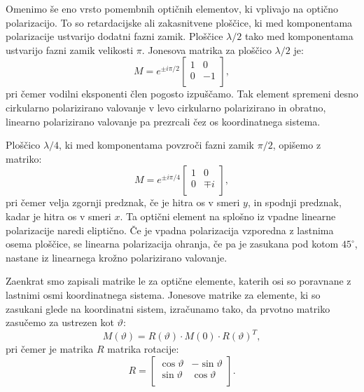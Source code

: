 Omenimo še eno vrsto pomembnih optičnih elementov, ki vplivajo na optično
polarizacijo. To so retardacijske ali zakasnitvene ploščice, ki med 
komponentama polarizacije ustvarijo dodatni fazni zamik. 
Ploščice $\lambda/2$ tako med komponentama
ustvarijo fazni zamik velikosti $\pi$. Jonesova matrika za ploščico $\lambda/2$ je:
\begin{equation}
M = e^{\pm i\pi/2}
\left[\begin{array}{cc}
1 & 0 \\
0 & -1\\
\end{array}\right]\!\!,
\label{eq:03_55}
\end{equation}
pri čemer vodilni eksponenti člen pogosto izpuščamo. 
Tak element spremeni desno cirkularno polarizirano valovanje v levo cirkularno polarizirano
in obratno, linearno polarizirano valovanje pa prezrcali čez os koordinatnega sistema.

Ploščico $\lambda/4$, ki med komponentama povzroči fazni zamik $\pi/2$, opišemo z matriko:
\begin{equation}
M = e^{\pm i\pi/4}
\left[\begin{array}{cc}
1 & 0 \\
0 & \mp i\\
\end{array}\right]\!\!,
\label{eq:03_56}
\end{equation}
pri čemer velja zgornji predznak, če je hitra os v smeri $y$, in spodnji predznak, kadar
je hitra os v smeri $x$. Ta optični element na splošno iz vpadne linearne
polarizacije naredi eliptično. Če je vpadna polarizacija vzporedna z
lastnima osema ploščice, se linearna polarizacija ohranja, če pa je
zasukana pod kotom $45^\circ$, nastane iz linearnega krožno polarizirano valovanje. 

Zaenkrat smo zapisali matrike le za optične elemente, katerih osi so poravnane z lastnimi osmi
koordinatnega sistema. Jonesove matrike za elemente, ki so zasukani glede na 
koordinatni sistem, izračunamo tako, da prvotno matriko zasučemo za ustrezen kot $\vartheta$:
\begin{equation}
M(\vartheta) = R(\vartheta) \cdot M (0) \cdot R(\vartheta)^{T},
\label{eq:03_57}
\end{equation}
pri čemer je matrika $R$ matrika rotacije:
\begin{equation}
R = \left[\begin{array}{cc}
\cos \vartheta & -\sin\vartheta \\
\sin \vartheta & \cos \vartheta\\
\end{array}\right]\!\!.
\label{eq:03_58}
\end{equation}

